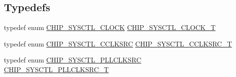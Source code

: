 \subsection*{Typedefs}
\begin{DoxyCompactItemize}
\item 
typedef enum \hyperlink{group__CLOCK__17XX__40XX_ga16115d41e6af3d543d4c5457d8d8343c}{C\-H\-I\-P\-\_\-\-S\-Y\-S\-C\-T\-L\-\_\-\-C\-L\-O\-C\-K} \hyperlink{group__CLOCK__17XX__40XX_ga82e75cbe777e79f448fec3987ddd978e}{C\-H\-I\-P\-\_\-\-S\-Y\-S\-C\-T\-L\-\_\-\-C\-L\-O\-C\-K\-\_\-\-T}
\item 
typedef enum \hyperlink{group__CLOCK__17XX__40XX_ga1eb1eeae65911ee3e97009ae1d31d03f}{C\-H\-I\-P\-\_\-\-S\-Y\-S\-C\-T\-L\-\_\-\-C\-C\-L\-K\-S\-R\-C} \hyperlink{group__CLOCK__17XX__40XX_ga983f42d70f3939d1f1b46673e9e1f838}{C\-H\-I\-P\-\_\-\-S\-Y\-S\-C\-T\-L\-\_\-\-C\-C\-L\-K\-S\-R\-C\-\_\-\-T}
\item 
typedef enum \hyperlink{group__CLOCK__17XX__40XX_gab8e9f23b5fc6f78e50dbe7310743573d}{C\-H\-I\-P\-\_\-\-S\-Y\-S\-C\-T\-L\-\_\-\-P\-L\-L\-C\-L\-K\-S\-R\-C} \hyperlink{group__CLOCK__17XX__40XX_gacda7fd6d13922330ce9344dbc4ec85b7}{C\-H\-I\-P\-\_\-\-S\-Y\-S\-C\-T\-L\-\_\-\-P\-L\-L\-C\-L\-K\-S\-R\-C\-\_\-\-T}
\end{DoxyCompactItemize}
